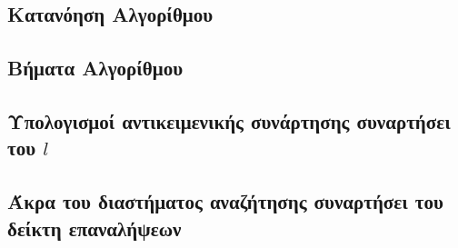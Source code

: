\subsection{Κατανόηση Αλγορίθμου}

\subsection{Βήματα Αλγορίθμου}

\subsection{Υπολογισμοί αντικειμενικής συνάρτησης συναρτήσει του $l$}

\subsection{Άκρα του διαστήματος αναζήτησης συναρτήσει του δείκτη επαναλήψεων}